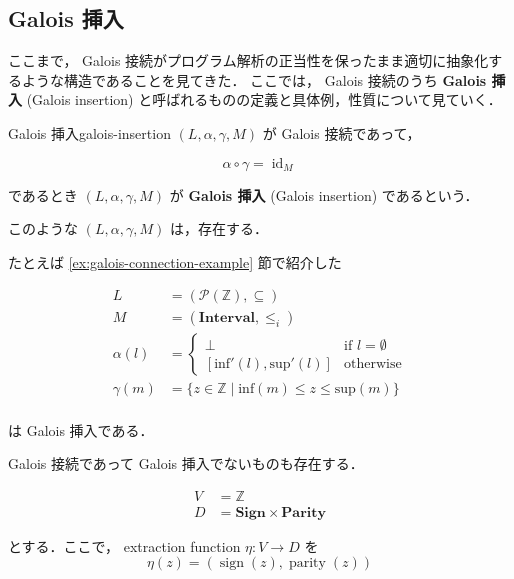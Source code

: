 \documentclass[uplatex]{jsarticle}
\begin{document}
\subsection{Galois 挿入}

ここまで， Galois 接続がプログラム解析の正当性を保ったまま適切に抽象化するような構造であることを見てきた．
ここでは， Galois 接続のうち \textbf{Galois 挿入} (Galois insertion) と呼ばれるものの定義と具体例，性質について見ていく．

\begin{boxdefinition}{Galois 挿入}{galois-insertion}
  $(L, \alpha, \gamma, M)$ が Galois 接続であって，

  $$
    \alpha \circ \gamma = \operatorname{id}_M
  $$

  であるとき $(L, \alpha, \gamma, M)$ が \textbf{Galois 挿入} (Galois insertion) であるという．
\end{boxdefinition}

このような $(L, \alpha, \gamma, M)$ は，存在する．

たとえば \ref{ex:galois-connection-example} 節で紹介した


\begin{align*}
  L         & = (\mathcal{P}(\mathbb{Z}), \subseteq)                                    \\
  M         & = (\textbf{Interval}, \leq_i)                                             \\
  \alpha(l) & = \begin{cases}
                  \bot \quad                           & \text{if } l = \emptyset \\
                  [\mathrm{inf'}(l), \mathrm{sup'}(l)] & \text{otherwise}
                \end{cases}         \\
  \gamma(m) & = \{ z \in \mathbb{Z} \mid \mathrm{inf}(m) \leq z \leq \mathrm{sup}(m) \} \\
\end{align*}

は Galois 挿入である．

Galois 接続であって Galois 挿入でないものも存在する．

\begin{align*}
  V & = \mathbb{Z}                           \\
  D & = \textbf{Sign} \times \textbf{Parity}
\end{align*}

とする．ここで， extraction function $\eta: V \to D$ を
$$
  \eta(z) = (\operatorname{sign}(z), \operatorname{parity}(z))
$$
\end{document}
